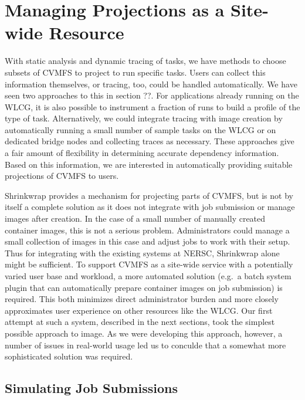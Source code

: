 \documentclass[sigconf]{acmart}
\begin{document}
\section{Managing Projections as a Site-wide Resource}

With static analysis and dynamic tracing of tasks,
we have methods to choose subsets of CVMFS to project to run specific tasks.
Users can collect this information themselves,
or tracing, too, could be handled automatically.
We have seen two approaches to this in section ??.
For applications already running on the WLCG,
it is also possible to instrument a fraction of runs to build a profile of the type of task.
Alternatively, we could integrate tracing with image creation by automatically running a small number of sample tasks on the WLCG or on dedicated bridge nodes and collecting traces as necessary.
These approaches give a fair amount of flexibility in determining accurate dependency information.
Based on this information,
we are interested in automatically providing suitable projections of CVMFS to users.

Shrinkwrap provides a mechanism for projecting parts of CVMFS,
but is not by itself a complete solution as it does not integrate with job submission or manage images after creation.
In the case of a small number of manually created container images,
this is not a serious problem.
Administrators could manage a small collection of images in this case and adjust jobs to work with their setup.
Thus for integrating with the existing systems at NERSC,
Shrinkwrap alone might be sufficient.
To support CVMFS as a site-wide service with a potentially varied user base and workload,
a more automated solution
(e.g.\ a batch system plugin that can automatically prepare container images on job submission)
is required.
This both minimizes direct administrator burden and more closely approximates user experience on other resources like the WLCG.
Our first attempt at such a system,
described in the next sections,
took the simplest possible approach to image.
As we were developing this approach, however,
a number of issues in real-world usage led us to conculde that a somewhat more sophisticated solution was required.

\subsection{Simulating Job Submissions}
\end{document}
